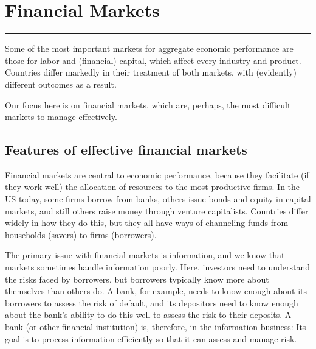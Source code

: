\chapter{Financial Markets}\label{chp:fnmk}
\hypertarget{finance}{}


\rule{\textwidth}{1pt}

Some of the most important markets for aggregate economic performance
are those for labor and (financial) capital,
which affect every industry and product.
Countries differ markedly in their treatment of both markets,
with (evidently) different outcomes as a result.

Our focus here is on financial markets,
which are, perhaps, the most difficult markets to manage effectively.


\section{Features of effective financial markets }

Financial markets are central to economic performance,
because they facilitate (if they work well)
the allocation of resources to the most-productive firms.
In the US today,
some firms borrow from banks,
others issue bonds  and equity in capital markets,
and still others raise money through venture capitalists.
Countries differ widely in how they do this,
but they all have ways of channeling funds from
households (savers) to firms (borrowers).


The primary issue with financial markets is information,
and we know that markets sometimes handle information poorly.
Here, investors need to understand the risks faced by borrowers,
but borrowers typically know more about themselves than others do.
A bank, for example, needs to know enough about its borrowers to
assess the risk of default, and its depositors need to know enough about the bank's ability to
do this well to assess the risk to their deposits.
A bank (or other financial institution) is, therefore, in the information business:
Its goal is to process information efficiently so that it
can assess and manage risk.


